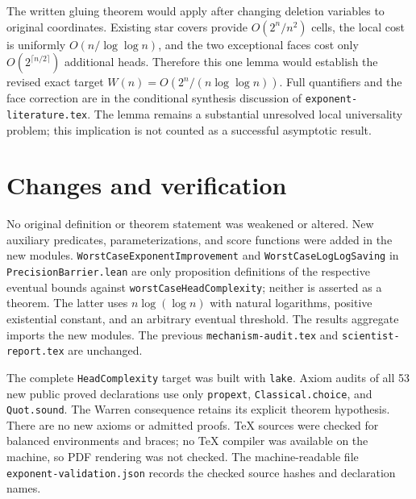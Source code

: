 \documentclass[11pt]{article}
\begin{document}
The written gluing theorem would apply after changing deletion
variables to original coordinates. Existing star covers provide
$O(2^n/n^2)$ cells, the local cost is uniformly $O(n/\log\log n)$,
and the two exceptional faces cost only
$O(2^{\lceil n/2\rceil})$ additional heads. Therefore this one lemma
would establish the revised exact target
$W(n)=O(2^n/(n\log\log n))$. Full quantifiers and the face
correction are in the conditional synthesis discussion of
\texttt{exponent-literature.tex}. The lemma remains a substantial
unresolved local universality problem; this implication is not
counted as a successful asymptotic result.

\section{Changes and verification}

No original definition or theorem statement was weakened or altered.
New auxiliary predicates, parameterizations, and score functions were
added in the new modules. \texttt{WorstCaseExponentImprovement} and
\texttt{WorstCaseLogLogSaving} in \texttt{PrecisionBarrier.lean} are
only proposition definitions of the respective eventual bounds
against \texttt{worstCaseHeadComplexity}; neither is asserted as a
theorem. The latter uses $n\log(\log n)$ with natural logarithms,
positive existential constant, and an arbitrary eventual threshold.
The results aggregate imports the
new modules. The previous \texttt{mechanism-audit.tex} and
\texttt{scientist-report.tex} are unchanged.

The complete \texttt{HeadComplexity} target was built with
\texttt{lake}. Axiom audits of all 53 new public proved declarations use only
\texttt{propext}, \texttt{Classical.choice}, and \texttt{Quot.sound}.
The Warren consequence retains its explicit theorem hypothesis.
There are no new axioms or admitted proofs. TeX sources were checked
for balanced environments and braces; no TeX compiler was available
on the machine, so PDF rendering was not checked.
The machine-readable file \texttt{exponent-validation.json} records
the checked source hashes and declaration names.
\end{document}
